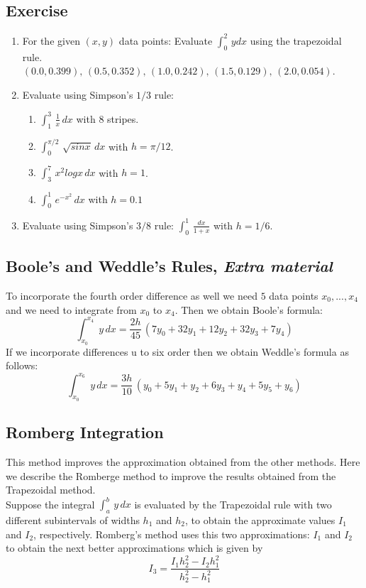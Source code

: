 \documentclass[aima203_lecturenotes_ku.tex]{subfiles}
\begin{document}
\subsection{Exercise}
\begin{enumerate}
\item For the given $(x,y)$ data points: Evaluate $\int_0^2 \, ydx$ using the trapezoidal rule.\\  $(0.0,0.399),\, (0.5,0.352),\,(1.0,0.242),\, (1.5,0.129),\,(2.0,0.054)$.

\item Evaluate using Simpson's $1/3$ rule:
  \begin{enumerate}
  \item $\displaystyle \int_1^3 \, \frac{1}{x}\,dx$  with $8$ stripes.
  \item $\displaystyle \int_0^{\pi /2} \, \sqrt{sinx}\, dx$ with $h= \pi /12$.

  \item $\displaystyle \int_3^7 \, x^2logx\, dx $ with $h= 1$.
    \item $\displaystyle \int_0^1 \, e^{-x^2} \, dx$ with $h=0.1$
  \end{enumerate}

\item Evaluate using Simpson's $3/8$ rule: $\displaystyle \int_0^1 \, \frac{dx}{1+x}$ with $h=1/6$.
\end{enumerate}
\subsection{Boole's and Weddle's Rules, \textit{Extra material}}
To incorporate the fourth order difference as well we need $5$ data points $x_0, ..., x_4$ and we need to integrate from $x_0$ to $x_4$. Then we obtain Boole's formula:
\begin{equation}
  \label{Boole's}
  \displaystyle \int_{x_0}^{x_4} \; y\,dx = \frac{2h}{45}\, (7y_0 + 32y_1 + 12y_2+32y_3+7y_4)
\end{equation}
If we incorporate differences u to six order then we obtain Weddle's formula as follows:
\begin{equation}
  \label{Weddle's}
  \displaystyle \int_{x_0}^{x_6} \; y\,dx = \frac{3h}{10}\, (y_0 + 5y_1 + y_2+6y_3+y_4+5y_5+y_6)
\end{equation}

\subsection{Romberg Integration}
This method improves the approximation obtained from the other methods. Here we describe the Romberge method to improve the results obtained from the Trapezoidal method. \\[2mm]
Suppose the integral $\displaystyle \int_a^b \, y\,dx$ is evaluated by the Trapezoidal rule with two different subintervals of widths $h_1$ and $h_2$, to obtain the approximate values $I_1$ and $I_2$, respectively. Romberg's method uses this two approximations: $I_1$ and $I_2$ to obtain the next better approximations which is given by
\begin{equation}
  \label{romberg}
I_3 = \frac{I_1h_2^2-I_2h_1^2}{h_2^2 - h_1^2}
\end{equation}
\end{document}
